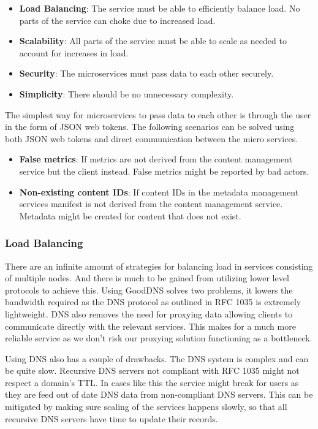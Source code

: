 \documentclass[12pt]{article}
\begin{document}
\begin{itemize}
    \item \textbf{Load Balancing}: The service must be able to efficiently balance load. No parts of the service can choke due to increased load.
    \item \textbf{Scalability}: All parts of the service must be able to scale as needed to account for increases in load.
    \item \textbf{Security}: The microservices must pass data to each other securely.
    \item \textbf{Simplicity}: There should be no unnecessary complexity.
\end{itemize}

The simplest way for microservices to pass data to each other is through the user in the form of
JSON web tokens. The following scenarios can be solved using both JSON web tokens and direct communication between the micro services.

\begin{itemize}
    \item \textbf{False metrics}: If metrics are not derived from the content management service but the client instead. False metrics might be reported by bad actors.
    \item \textbf{Non-existing content IDs}: If content IDs in the metadata management services manifest is not derived from the content management service. Metadata might be created for content that does not exist.
\end{itemize}

\subsubsection{Load Balancing}
There are an infinite amount of strategies for balancing load in services consisting of multiple nodes.
And there is much to be gained from utilizing lower level protocols to achieve this. Using GoodDNS solves
two problems, it lowers the bandwidth required as the DNS protocol as outlined in RFC 1035 is extremely lightweight.
DNS also removes the need for proxying data allowing clients to communicate directly with the relevant services.
This makes for a much more reliable service as we don't risk our proxying solution functioning as a bottleneck.

Using DNS also has a couple of drawbacks. The DNS system is complex and can be quite slow.
Recursive DNS servers not compliant with RFC 1035 might not respect a domain's TTL.
In cases like this the service might break for users as they are feed out of date DNS data
from non-compliant DNS servers. This can be mitigated by making sure scaling of the services
happens slowly, so that all recursive DNS servers have time to update their records.
\end{document}
